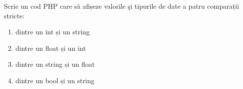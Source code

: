 \begin{Exercise}[title={Verifică-ți puterea de a face analogii},difficulty=1]
Scrie un cod PHP care să afișeze valorile şi tipurile de date a patru comparații stricte:
\begin{enumerate}
    \item dintre un int și un string
    \item dintre un float și un int
    \item dintre un string și un float
    \item dintre un bool și un string
\end{enumerate}
\end{Exercise}


